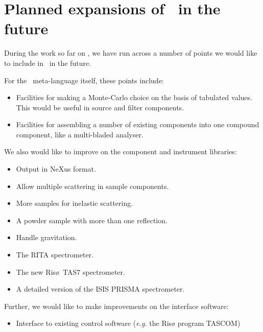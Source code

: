 
\chapter{Planned expansions of \MCS\ in the future}
\label{future}

During the work so far on
\MCS, we have run across a number of points we would like to
include in \MCS\ in the future.

For the \MCS\ meta-language itself, these points include:
\begin{itemize}
\item Facilities for making a Monte-Carlo choice on the basis of 
tabulated values. This would be useful in source and filter components.
\item Facilities for assembling a number of existing components into one
compound component, like a multi-bladed analyser.
\end{itemize}
We also would like to improve on the component and instrument libraries:
\begin{itemize}
\item Output in NeXus format.
\item Allow multiple scattering in sample components.
\item More samples for inelastic scattering.
\item A powder sample with more than one reflection.
\item Handle gravitation.
\item The RITA spectrometer.
\item The new Ris\o\ TAS7 spectrometer.
\item A detailed version of the ISIS PRISMA spectrometer.
\end{itemize}
Further, we would like to make improvements on the interface software:
\begin{itemize}
\item Interface to existing control software ({\em e.g.} the Ris\o{}
  program TASCOM)
\end{itemize}
